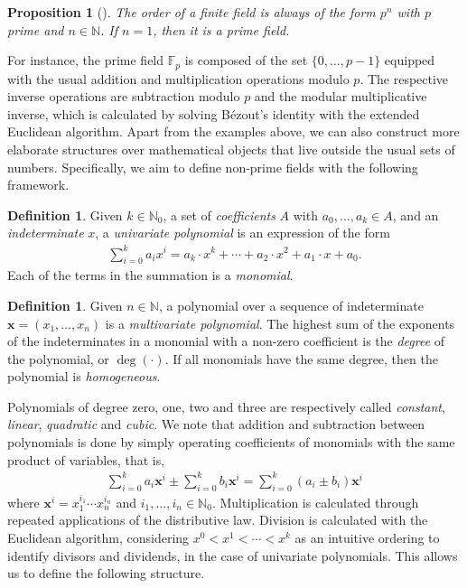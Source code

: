 \documentclass[english]{ufsc-thesis-rn46-2019/ufsc-thesis-rn46-2019}
\newtheorem{proposition}[theorem]{Proposition}
\theoremstyle{definition}
\newtheorem{definition}[theorem]{Definition}
\begin{document}
\begin{proposition}[{\cite[Cor.~2.18]{Mullen:2013}}]
  The order of a finite field is always of the form $p^{n}$ with $p$ prime and
  $n \in \mathbb{N}$. If $n = 1$, then it is a \emph{prime field}.
\end{proposition}

For instance, the prime field $\mathbb{F}_{p}$ is composed of the set
$\{0, \dots, p - 1\}$ equipped with the usual addition and multiplication
operations modulo $p$. The respective inverse operations are subtraction modulo
$p$ and the modular multiplicative inverse, which is calculated by solving
Bézout's identity with the extended Euclidean algorithm. Apart from the
examples above, we can also construct more elaborate structures over
mathematical objects that live outside the usual sets of numbers. Specifically,
we aim to define non-prime fields with the following framework.

\begin{definition}
  Given $k \in \mathbb{N}_{0}$, a set of \emph{coefficients} $A$ with
  $a_{0}, \dots, a_{k} \in A$, and an \emph{indeterminate} $x$, a
  \emph{univariate polynomial} is an expression of the form
  \begin{align}
    \sum_{i = 0}^{k} a_{i} x^{i}
      = a_{k} \cdot x^{k} + \cdots + a_{2} \cdot x^{2} + a_{1} \cdot x + a_{0}.
  \end{align}
  Each of the terms in the summation is a \emph{monomial}.
\end{definition}

\begin{definition}
  Given $n \in \mathbb{N}$, a polynomial over a sequence of indeterminate
  $\mathbf{x} = (x_{1}, \dots, x_{n})$ is a \emph{multivariate polynomial}.
  The highest sum of the exponents of the indeterminates in a monomial with
  a non-zero coefficient is the \emph{degree} of the polynomial, or
  $\deg(\cdot)$. If all monomials have the same degree, then the polynomial
  is \emph{homogeneous}.
\end{definition}

Polynomials of degree zero, one, two and three are respectively called
\emph{constant}, \emph{linear}, \emph{quadratic} and \emph{cubic}. We note that
addition and subtraction between polynomials is done by simply operating
coefficients of monomials with the same product of variables, that is,
\begin{align}
  \sum_{i = 0}^{k} a_{i} \mathbf{x}^{i}
    \pm \sum_{i = 0}^{k} b_{i} \mathbf{x}^{i}
      = \sum_{i = 0}^{k} (a_{i} \pm b_{i}) \mathbf{x}^{i}
\end{align}
where $\mathbf{x}^{i} = x_{1}^{i_{1}} \cdots x_{n}^{i_{n}}$ and
$i_{1}, \dots, i_{n} \in \mathbb{N}_{0}$. Multiplication is calculated through
repeated applications of the distributive law. Division is calculated with the
Euclidean algorithm, considering $x^{0} < x^{1} < \cdots < x^{k}$ as an
intuitive ordering to identify divisors and dividends, in the case of
univariate polynomials. This allows us to define the following structure.
\end{document}
